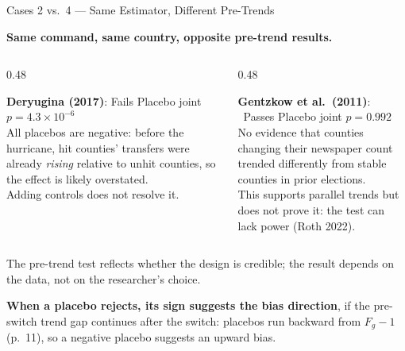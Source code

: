 \documentclass[main.tex]{subfiles}
\begin{document}
\begin{frame}{Cases 2 vs.\ 4 --- Same Estimator, Different Pre-Trends}

  \textbf{Same command, same country, opposite pre-trend results.}

  \bigskip
  \begin{columns}[T]
    \begin{column}{0.48\textwidth}
      \begin{alertblock}{\textbf{Deryugina (2017)}: \alert{Fails}}
        Placebo joint $p = 4.3\!\times\!10^{-6}$\\[4pt]
        All placebos are negative: before the
        hurricane, hit counties' transfers were
        already \emph{rising} relative to unhit
        counties, so the effect is likely overstated.\\[4pt]
        Adding controls does not resolve it.
      \end{alertblock}
    \end{column}
    \begin{column}{0.48\textwidth}
      \begin{exampleblock}{\textbf{Gentzkow et al.\ (2011)}: \checkmark\ Passes}
        Placebo joint $p = 0.992$\\[4pt]
        No evidence that counties changing their
        newspaper count trended differently from
        stable counties in prior elections.\\[4pt]
        This supports parallel trends but does not
        prove it: the test can lack power (Roth 2022).
      \end{exampleblock}
    \end{column}
  \end{columns}

  \smallskip
  \centering\small
  The pre-trend test reflects whether the design is credible;
  the result depends on the data, not on the researcher's choice.

  \smallskip
  \raggedright\footnotesize
  \textbf{When a placebo rejects, its sign suggests the bias direction}, if
  the pre-switch trend gap continues after the switch: placebos run backward
  from $F_g-1$ (p.~11), so a negative placebo suggests an upward bias.

\end{frame}

\end{document}
